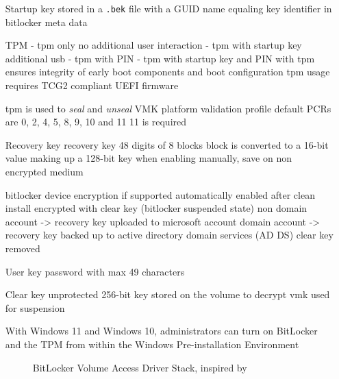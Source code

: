 \begin{itemize}
    \item[Startup key] stored in a \lstinline{.bek} file with a \ac{GUID} name equaling key identifier in bitlocker meta data
        \cite[2.6. Startup key]{bde-format-spec}
    \item[TPM]
        - tpm only
        no additional user interaction
        - tpm with startup key
        additional usb
        - tpm with PIN
        - tpm with startup key and PIN
        \cite{microsoft-bitlocker-countermeasures}
        with tpm ensures integrity of early boot components and boot configuration
        tpm usage requires \ac{TCG}2 compliant \ac{UEFI} firmware \cite[9. TPM]{windows-internals-6-part2}

        tpm is used to \emph{seal} and \emph{unseal} \ac{VMK}
        platform validation profile
        default \acp{PCR} are 0, 2, 4, 5, 8, 9, 10 and 11
        11 is required
    \item[Recovery key] recovery key 48 digits of 8 blocks
        block is converted to a 16-bit value making up a 128-bit key
        \cite[2.4. Recovery key]{bde-format-spec}
        when enabling manually, save on non encrypted medium
        \cite{microsoft-bitlocker-basic-deployment}

        bitlocker device encryption if supported automatically enabled
        after clean install encrypted with clear key (bitlocker suspended state)
        non domain account -> recovery key uploaded to microsoft account
        domain account -> recovery key backed up to active directory domain services (AD DS)
        clear key removed
        \cite{microsoft-bitlocker-device-encryption}

    \item[User key] password with max 49 characters
        \cite[2.7. User key]{bde-format-spec}
    \item[Clear key] unprotected 256-bit key stored on the volume to decrypt vmk
        \cite[2.5. Clear key]{bde-format-spec}
        used for suspension


         With Windows 11 and Windows 10, administrators can turn on BitLocker and the TPM from within the Windows Pre-installation Environment \cite{microsoft-bitlocker-device-encryption}

        \begin{figure}[htb]%
            \centering
            
            \caption{BitLocker Volume Access Driver Stack, inspired by \cite[Figure 9-24]{windows-internals-6-part2}}%
            \label{fig:bitlocker-volume-access-driver-stack}%
        \end{figure}

\end{itemize}